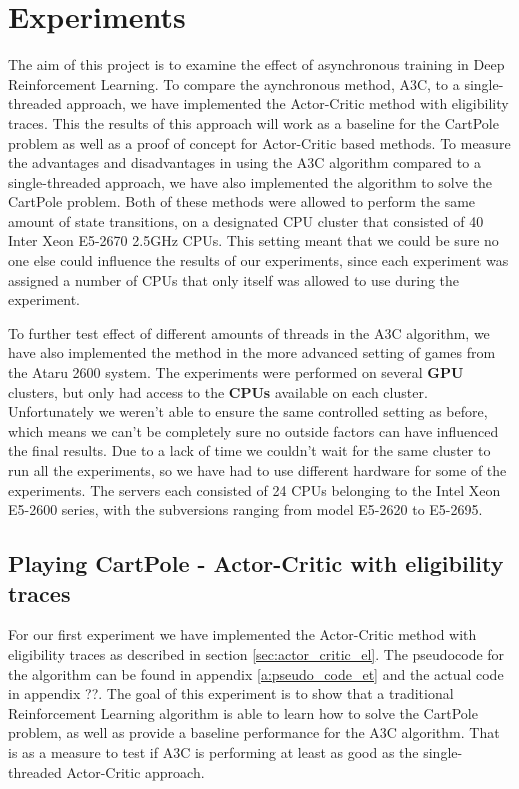 \documentclass[11pt]{article}
\begin{document}

\section{Experiments}

The aim of this project is to examine the effect of asynchronous training
in Deep Reinforcement Learning.
To compare the aynchronous method, A3C, to a single-threaded approach,
we have implemented the Actor-Critic method with eligibility traces.
This the results of this approach will work as a baseline for the
CartPole problem as well as a proof of concept for Actor-Critic based
methods.
To measure the advantages and disadvantages in using the A3C algorithm
compared to a single-threaded approach, we have also implemented the algorithm
to solve the CartPole problem.
Both of these methods were allowed to perform the same amount of state transitions,
on a designated CPU cluster that consisted of 40 Inter Xeon E5-2670 2.5GHz CPUs.
This setting meant that we could be sure no one else could influence the results
of our experiments, since each experiment was assigned a number of CPUs
that only itself was allowed to use during the experiment.

To further test effect of different amounts of threads in the A3C algorithm,
we have also implemented the method in the more advanced setting of
games from the Ataru 2600 system.
The experiments were performed on several \textbf{GPU} clusters, but only had access to
the \textbf{CPUs} available on each cluster.
Unfortunately we weren't able to ensure the same controlled
setting as before, which means we can't be completely sure
no outside factors can have influenced the final results.
Due to a lack of time we couldn't wait for the same cluster to
run all the experiments, so we have had to use different hardware
for some of the experiments.
The servers each consisted of 24 CPUs belonging to the Intel Xeon
E5-2600 series, with the subversions ranging from model E5-2620 to
E5-2695.

\subsection{Playing CartPole - Actor-Critic with eligibility traces}

For our first experiment we have implemented the Actor-Critic method
with eligibility traces as described in section \ref{sec:actor_critic_el}.
The pseudocode for the algorithm can be found in
appendix \ref{a:pseudo_code_et} and the actual code in appendix ??.
The goal of this experiment is to show that a 
traditional Reinforcement Learning algorithm
is able to learn how to solve the CartPole problem, as well as provide a
baseline performance for the A3C algorithm.
That is as a measure to test if A3C is performing at least as good
as the single-threaded Actor-Critic approach.
\end{document}
